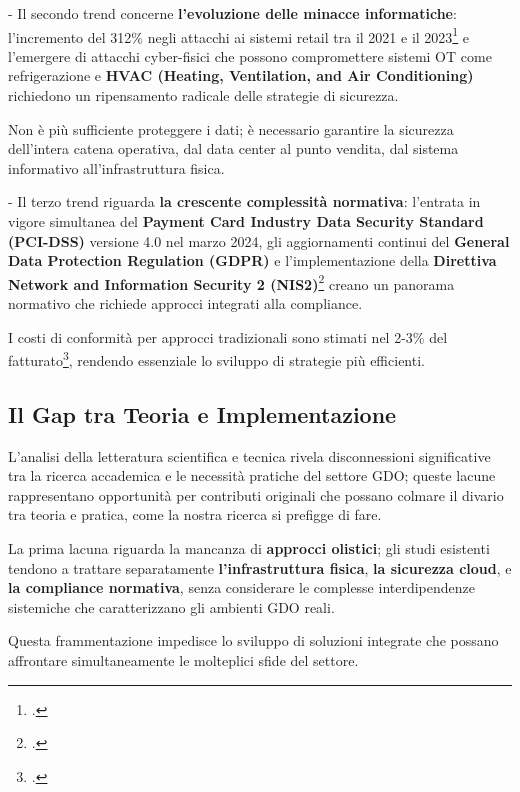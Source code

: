- Il secondo trend concerne \textbf{l'evoluzione delle minacce
informatiche}: l'incremento del 312\% negli attacchi ai sistemi retail
tra il 2021 e il 2023\footcite{mandiant2025mtrends} e l'emergere di attacchi cyber-fisici che possono
compromettere sistemi OT come refrigerazione e \textbf{HVAC (Heating,
Ventilation, and Air Conditioning)} richiedono un ripensamento radicale
delle strategie di sicurezza.

Non è più sufficiente proteggere i dati; è necessario garantire la
sicurezza dell'intera catena operativa, dal data center al punto
vendita, dal sistema informativo all'infrastruttura fisica.

- Il terzo trend riguarda \textbf{la crescente complessità normativa}:
l'entrata in vigore simultanea del \textbf{Payment Card Industry Data
Security Standard (PCI-DSS)} versione 4.0 nel marzo 2024, gli
aggiornamenti continui del \textbf{General Data Protection Regulation
(GDPR)} e l'implementazione della \textbf{Direttiva Network and
Information Security 2 (NIS2)}\footcite{pcissc2022pci} creano un panorama normativo che richiede
approcci integrati alla compliance.

I costi di conformità per approcci tradizionali sono stimati nel 2-3\%
del fatturato\footcite{reuters2024truecost}, rendendo essenziale lo sviluppo di strategie più
efficienti.

\subsection{\texorpdfstring{\textbf{Il Gap tra Teoria e
Implementazione}}{Il Gap tra Teoria e Implementazione}}\label{il-gap-tra-teoria-e-implementazione}

L'analisi della letteratura scientifica e tecnica rivela disconnessioni
significative tra la ricerca accademica e le necessità pratiche del
settore GDO; queste lacune rappresentano opportunità per contributi
originali che possano colmare il divario tra teoria e pratica, come la nostra ricerca si prefigge di fare.

La prima lacuna riguarda la mancanza di \textbf{approcci olistici}; gli studi
esistenti tendono a trattare separatamente \textbf{l'infrastruttura fisica}, \textbf{la
sicurezza cloud}, e \textbf{la compliance normativa}, senza considerare le
complesse interdipendenze sistemiche che caratterizzano gli ambienti GDO
reali.

Questa frammentazione impedisce lo sviluppo di soluzioni integrate che
possano affrontare simultaneamente le molteplici sfide del settore.

